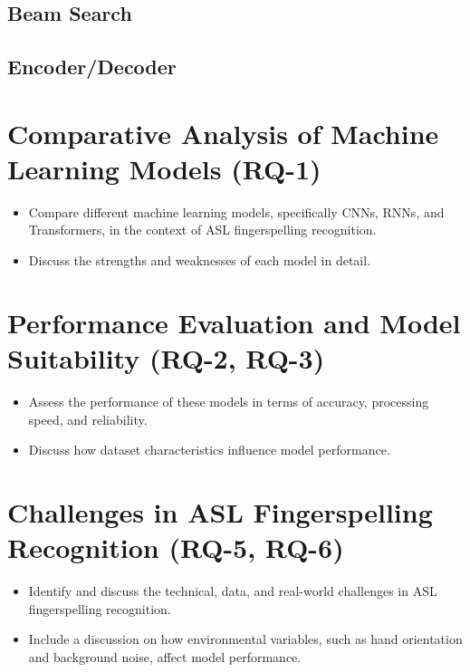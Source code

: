 \subsection{Beam Search}

\subsection{Encoder/Decoder}

\section{Comparative Analysis of Machine Learning Models (RQ-1)}

\begin{itemize}
    \item Compare different machine learning models, specifically CNNs, RNNs, and Transformers, in the context of ASL fingerspelling recognition.
    \item Discuss the strengths and weaknesses of each model in detail.
\end{itemize}

\section{Performance Evaluation and Model Suitability (RQ-2, RQ-3)}

\begin{itemize}
    \item Assess the performance of these models in terms of accuracy, processing speed, and reliability.
    \item Discuss how dataset characteristics influence model performance.
\end{itemize}

\section{Challenges in ASL Fingerspelling Recognition (RQ-5, RQ-6)}

\begin{itemize}
    \item Identify and discuss the technical, data, and real-world challenges in ASL fingerspelling recognition.
    \item Include a discussion on how environmental variables, such as hand orientation and background noise, affect model performance.
\end{itemize}

